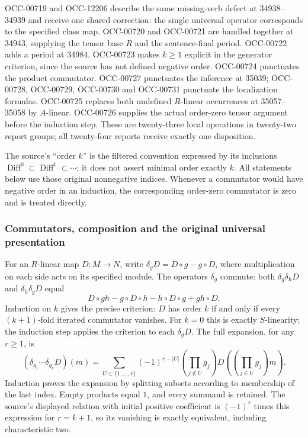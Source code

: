 OCC-00719 and OCC-12206 describe the same missing-verb defect at 34938--34939 and receive one shared correction: the single universal operator corresponds to the specified class map. OCC-00720 and OCC-00721 are handled together at 34943, supplying the tensor base \(R\) and the sentence-final period. OCC-00722 adds a period at 34984. OCC-00723 makes \(k\ge1\) explicit in the generator criterion, since the source has not defined negative order. OCC-00724 punctuates the product commutator. OCC-00727 punctuates the inference at 35039; OCC-00728, OCC-00729, OCC-00730 and OCC-00731 punctuate the localization formulas. OCC-00725 replaces both undefined \(R\)-linear occurrences at 35057--35058 by \(A\)-linear. OCC-00726 supplies the actual order-zero tensor argument before the induction step. These are twenty-three local operations in twenty-two report groups; all twenty-four reports receive exactly one disposition.

The source's ``order \(k\)'' is the filtered convention expressed by its inclusions \(\operatorname{Diff}^0\subset\operatorname{Diff}^1\subset\cdots\); it does not assert minimal order exactly \(k\). All statements below use those original nonnegative indices. Whenever a commutator would have negative order in an induction, the corresponding order-zero commutator is zero and is treated directly.

\subsubsection{Commutators, composition and the original universal presentation}\label{algebra-proof-043-commutators-composition-and-the-original-universal-presentation}

For an \(R\)-linear map \(D:M\to N\), write \(\delta_gD=D\circ g-g\circ D\), where multiplication on each side acts on its specified module. The operators \(\delta_g\) commute: both \(\delta_g\delta_hD\) and \(\delta_h\delta_gD\) equal \[
D\circ gh-g\circ D\circ h-h\circ D\circ g+gh\circ D.
\] Induction on \(k\) gives the precise criterion: \(D\) has order \(k\) if and only if every \((k+1)\)-fold iterated commutator vanishes. For \(k=0\) this is exactly \(S\)-linearity; the induction step applies the criterion to each \(\delta_gD\). The full expansion, for any \(r\ge1\), is \[
(\delta_{g_1}\cdots\delta_{g_r}D)(m)
=\sum_{U\subset\{1,\ldots,r\}}(-1)^{r-|U|}
\left(\prod_{j\notin U}g_j\right)
D\left(\left(\prod_{j\in U}g_j\right)m\right).
\] Induction proves the expansion by splitting subsets according to membership of the last index. Empty products equal \(1\), and every summand is retained. The source's displayed relation with initial positive coefficient is \((-1)^r\) times this expression for \(r=k+1\), so its vanishing is exactly equivalent, including characteristic two.

